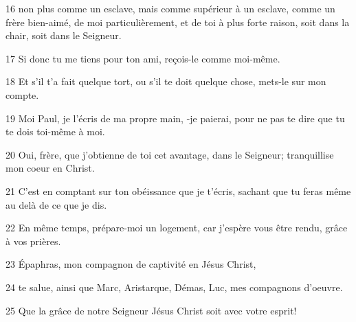\par 16 non plus comme un esclave, mais comme supérieur à un esclave, comme un frère bien-aimé, de moi particulièrement, et de toi à plus forte raison, soit dans la chair, soit dans le Seigneur.
\par 17 Si donc tu me tiens pour ton ami, reçois-le comme moi-même.
\par 18 Et s'il t'a fait quelque tort, ou s'il te doit quelque chose, mets-le sur mon compte.
\par 19 Moi Paul, je l'écris de ma propre main, -je paierai, pour ne pas te dire que tu te dois toi-même à moi.
\par 20 Oui, frère, que j'obtienne de toi cet avantage, dans le Seigneur; tranquillise mon coeur en Christ.
\par 21 C'est en comptant sur ton obéissance que je t'écris, sachant que tu feras même au delà de ce que je dis.
\par 22 En même temps, prépare-moi un logement, car j'espère vous être rendu, grâce à vos prières.
\par 23 Épaphras, mon compagnon de captivité en Jésus Christ,
\par 24 te salue, ainsi que Marc, Aristarque, Démas, Luc, mes compagnons d'oeuvre.
\par 25 Que la grâce de notre Seigneur Jésus Christ soit avec votre esprit!



